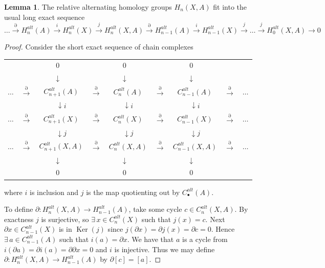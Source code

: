 \documentclass[11pt,a4paper,twoside]{article}
\theoremstyle{plain}
\theoremstyle{definition}
\theoremstyle{definition}
\newtheorem{lemma}[thm]{Lemma}
\theoremstyle{definition}
\theoremstyle{definition}
\theoremstyle{definition}
\DeclareMathOperator{\Ker}{Ker}
\begin{document}
\vspace{2mm}
\begin{lemma}
\label{lem:LongExactSeqAltRelHom}
The relative alternating homology groups $H_n(X,A)$ fit into the usual long exact sequence
$$\dots\!\overset\partial\longrightarrow\! H_n^{alt}(A)\!\overset i\longrightarrow\! H_n^{alt}(X)\!\overset j\longrightarrow\! H_n^{alt}(X,A)\!\overset\partial\longrightarrow\! H_{n\!-\!1}^{alt}(A)\!\overset i\longrightarrow\! H_{n\!-\!1}^{alt}(X)\!\overset j\longrightarrow\!\dots\!\overset j\longrightarrow\! H_0^{alt}(X,A)\!\longrightarrow\!0$$
\end{lemma}
\begin{proof}
Consider the short exact sequence of chain complexes

\begin{center}
\begin{tabular}{ c c c c c c c c c }
    &   & $0\quad$ &   & $0\quad$ &   & $0\quad$ &   &    \\
    &   & $\downarrow\quad$ && $\downarrow\quad$ && $\downarrow\quad$ &&\\
$\dots$ & $\overset\partial\longrightarrow$ & $C_{n\!+\!1}^{alt}(A)$ & $\overset\partial\longrightarrow$ &  $C_{n}^{alt}(A)$ & $\overset\partial\longrightarrow$ & $C_{n\!-\!1}^{alt}(A)$& $\overset\partial\longrightarrow$ & $\dots$\\
&   & $\downarrow i$ && $\downarrow i$ && $\downarrow i$ &&\\
$\dots$ & $\overset\partial\longrightarrow$ & $C_{n\!+\!1}^{alt}(X)$ & $\overset\partial\longrightarrow$ &  $C_{n}^{alt}(X)$ & $\overset\partial\longrightarrow$ & $C_{n\!-\!1}^{alt}(X)$& $\overset\partial\longrightarrow$ & $\dots$\\
    &   & $\downarrow j$ && $\downarrow j$ && $\downarrow j$ &&\\
$\dots$ & $\overset\partial\longrightarrow$ & $C_{n\!+\!1}^{alt}(X,A)$ & $\overset\partial\longrightarrow$ &  $C_{n}^{alt}(X,A)$ & $\overset\partial\longrightarrow$ & $C_{n\!-\!1}^{alt}(X,A)$& $\overset\partial\longrightarrow$ & $\dots$\\
    &   & $\downarrow\quad$ && $\downarrow\quad$ && $\downarrow\quad$ &&\\
        &   & $0\quad$ &   &$0\quad$ &   & $0\quad$ &   &    
\end{tabular}
\end{center}
where $i$ is inclusion and $j$ is the map quotienting out by $C_\bullet^{alt}(A)$.

To define $\partial\!:\!H_n^{alt}(X,A)\!\longrightarrow\!H_{n\!-\!1}^{alt}(A)$, take some cycle $c\in C_n^{alt}(X,A)$. By exactness $j$ is surjective, so $\exists\,x\in C_n^{alt}(X)$ such that $j(x)\!=\!c$. Next $\partial x\in C_{n\!-\!1}^{alt}(X)$ is in $\Ker(j)$ since $j(\partial x)=\partial j(x)=\partial c=0$. Hence $\exists\,a\in C_{n\!-\!1}^{alt}(A)$ such that $i(a)=\partial x$. We have that $a$ is a cycle from $i(\partial a)=\partial i(a)=\partial\partial x=0$ and $i$ is injective. Thus we may define $\partial\!:\!H_n^{alt}(X,A)\!\longrightarrow\!H_{n\!-\!1}^{alt}(A)$ by $\partial[c]=[a]$.


\end{proof}
\end{document}

